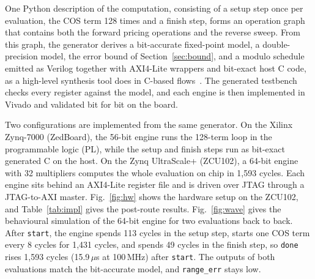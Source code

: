 \documentclass[conference]{IEEEtran}
\begin{document}
One Python description of the computation, consisting
of a setup step once per evaluation, the COS term 128 times and a finish step, forms an operation
graph that contains both the forward pricing operations and the reverse sweep. From this graph,
the generator derives a bit-accurate fixed-point model, a double-precision model, the error bound
of Section~\ref{sec:bound}, and a modulo schedule emitted as Verilog together with AXI4-Lite
wrappers and bit-exact host C code, as a high-level synthesis tool does in C-based
flows~\cite{cong22}. The generated testbench checks every register against the model, and each
engine is then implemented in Vivado and validated bit for bit on the board.



Two configurations are implemented from the same generator. On the Xilinx Zynq-7000 (ZedBoard),
the 56-bit engine runs the 128-term loop in the programmable logic (PL), while the setup and
finish steps run as bit-exact generated C on the host. On the Zynq UltraScale+ (ZCU102), a 64-bit
engine with 32 multipliers computes the whole evaluation on chip in 1,593 cycles. Each engine sits
behind an AXI4-Lite register file and is driven over JTAG through a JTAG-to-AXI master. Fig.~\ref{fig:hw} shows the hardware setup on the
ZCU102, and Table~\ref{tab:impl} gives the post-route results. Fig.~\ref{fig:wave} gives the
behavioural simulation of the 64-bit engine for two evaluations back to back. After \texttt{start},
the engine spends 113 cycles in the setup step, starts one COS term every 8 cycles for 1,431 cycles,
and spends 49 cycles in the finish step, so \texttt{done} rises 1,593 cycles (15.9\,$\mu$s at
100\,MHz) after \texttt{start}. The outputs of both evaluations match the bit-accurate model, and
\texttt{range\_err} stays low.
\end{document}

